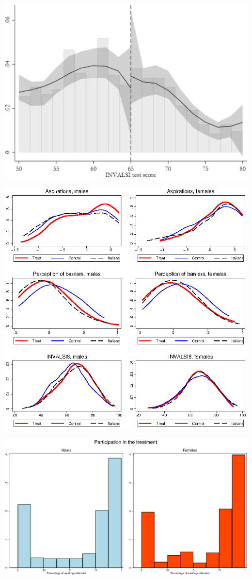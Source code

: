 \documentclass[12pt]{article}
\begin{document}
\includegraphics[scale=0.6]{mccracy_BW_f.eps}


\includegraphics[scale=1.6]{figure_distributions_f.eps}

\includegraphics[scale=0.9]{compliance_f.eps}
\end{document}

